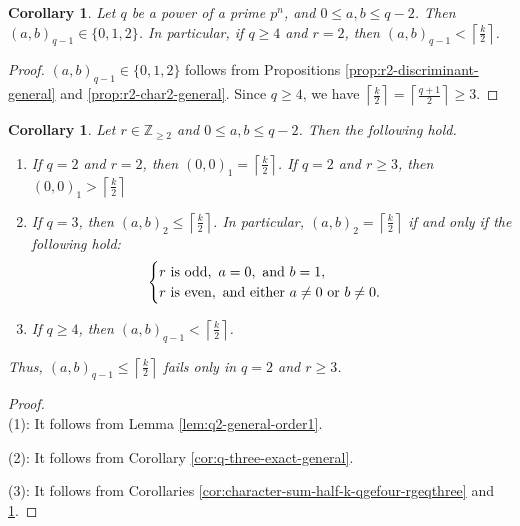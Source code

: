 \documentclass[10pt,a4paper]{article}
\newtheorem{cor}[thm]{Corollary}
\numberwithin{equation}{section}
\begin{document}
\begin{cor}\label{cor:r2-general-bound}
Let $q$ be a power of a prime $p^n$, and $0\le a,b\le q-2$. Then $(a,b)_{q-1}\in \{0,1,2\}$. In particular, if $q\ge 4$ and $r=2$, then $(a,b)_{q-1}< \left\lceil \frac{k}{2}\right\rceil$.
\end{cor}

\begin{proof}
$(a,b)_{q-1}\in \{0,1,2\}$ follows from Propositions \ref{prop:r2-discriminant-general} and \ref{prop:r2-char2-general}. Since $q\ge4$, we have $\left\lceil \frac{k}{2}\right\rceil=\left\lceil \frac{q+1}{2}\right\rceil\ge3$. 
\end{proof}


\begin{cor}\label{cor:character-sum-half-k-general}
Let $r\in \mathbb{Z}_{\ge2}$ and $0\le a,b\le q-2$. Then the following hold.
\begin{enumerate}
\item[\textup{(1)}] If $q=2$ and $r=2$, then $(0,0)_1=\left\lceil \frac{k}{2}\right\rceil$. If $q=2$ and $r\ge 3$, then $(0,0)_1>\left\lceil \frac{k}{2}\right\rceil$ 

\item[\textup{(2)}] If $q=3$, then $(a,b)_2\le \left\lceil \frac{k}{2}\right\rceil$. In particular, $(a,b)_2= \left\lceil \frac{k}{2}\right\rceil$ if and only if the following hold:
\[
\begin{cases}
r \textup{ is odd},\ a=0,\textup{ and } b=1,\\
r \textup{ is even},\textup{ and either } a\neq0 \textup{ or } b\neq0.
\end{cases}
\]

\item[\textup{(3)}] If $q\ge4$, then
$(a,b)_{q-1}< \left\lceil \frac{k}{2}\right\rceil$.
\end{enumerate}
Thus, $(a,b)_{q-1}\le \left\lceil \frac{k}{2}\right\rceil$ fails only in $q=2$ and $r\ge 3$.
\end{cor}

\begin{proof}
{ \,}\\
\noindent\textup{(1)}: It follows from Lemma \ref{lem:q2-general-order1}. 

\noindent\textup{(2)}: It follows from Corollary \ref{cor:q-three-exact-general}. 

\noindent\textup{(3)}: It follows from 
Corollaries \ref{cor:character-sum-half-k-qgefour-rgeqthree} and \ref{cor:r2-general-bound}.
\end{proof}
\end{document}

